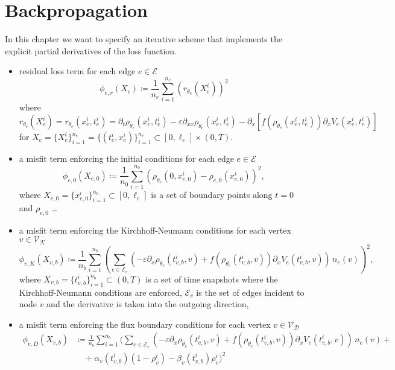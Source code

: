 \chapter{Backpropagation}

In this chapter we want to specify an iterative scheme that implements the explicit partial derivatives of the loss function.

\begin{itemize}
    \item residual loss term for each edge $e \in \mathcal{E}$ \begin{equation*} \phi_{e,r} (X_e) \coloneqq \frac{1}{n_e} \sum_{i=1}^{n_e} (r_{\theta_e} (X_e^i))^2 \end{equation*} where \begin{equation*} r_{\theta_e} (X_e^i) = r_{\theta_e} (x_e^i, t_e^i) = \partial_t \rho_{\theta_{e}} (x_{e}^i , t_{e}^i) - \varepsilon \partial_{xx} \rho_{\theta_e}(x_e^i, t_e^i) - \partial_x [f(\rho_{\theta_e}(x_e^i, t_e^i)) \partial_x V_e(x_e^i, t_e^i)] \end{equation*} for $X_e = \{X_e^i\}_{i=1}^{n_e} = \{(t_e^i, x_e^i)\}_{i=1}^{n_e} \subset [0,\ell_e] \times (0, T)$.
    \item a misfit term enforcing the initial conditions for each edge $e \in \mathcal{E}$ \begin{equation*} \phi_{e,0} (X_{e,0}) \coloneqq \frac{1}{n_0} \sum_{i=1}^{n_0} (\rho_{\theta_e} (0,x_{e,0}^i) - \rho_{e,0}(x_{e,0}^i))^2, \end{equation*} where $X_{e,0} = \{x_{e,0}^i\}_{i=1}^{n_0} \subset [0, \ell_e]$ is a set of boundary points along $t=0$ and $\rho_{e,0}$ \ldots
    \item a misfit term enforcing the Kirchhoff-Neumann conditions for each vertex $v \in \mathcal{V}_\mathcal{K}$ \begin{equation*} \phi_{v,K} (X_{v,b}) \coloneqq \frac{1}{n_b} \sum_{i=1}^{n_b} (\sum_{e \in \mathcal{E}_v} (- \varepsilon \partial_x \rho_{\theta_e} (t_{v,b}^i, v) + f(\rho_{\theta_e} (t_{v,b}^i, v)) \partial_x V_e(t_{v,b}^i, v)) \, n_e (v))^2, \end{equation*} where $X_{v,b} = \{t_{v,b}^i\}_{i=1}^{n_b} \subset (0,T)$ is a set of time snapshots where the Kirchhoff-Neumann conditions are enforced, $\mathcal{E}_v$ is the set of edges incident to node $v$ and the derivative is taken into the outgoing direction,
    \item a misfit term enforcing the flux boundary conditions for each vertex $v \in \mathcal{V}_\mathcal{D}$ \begin{align*} \phi_{v,D} (X_{v,b}) & \coloneqq \frac{1}{n_b} \sum_{i=1}^{n_b} ( \sum_{e\in \mathcal{E}_v} (-\varepsilon \partial_x \rho_{\theta_e} (t_{v,b}^i, v) + f(\rho_{\theta_e} (t_{v,b}^i, v)) \partial_x V_e(t_{v,b}^i, v)) \, n_e (v) + \\ & \quad + \alpha_v(t_{v,b}^i) (1-\rho_v^i) - \beta_v(t_{v,b}^i) \rho_v^i)^2 \end{align*}

\end{itemize}
